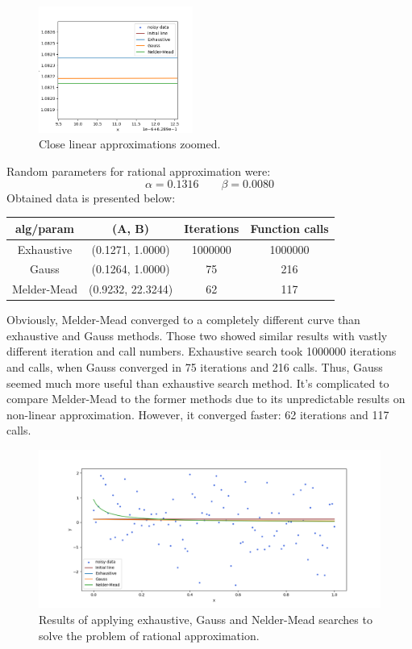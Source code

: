 \documentclass[12pt, a4paper]{article}
\begin{document}
\begin{figure}[!h]
\centering
\includegraphics[width=0.45\textwidth]{line2.png}
\caption{Close linear approximations zoomed.}
\end{figure}

Random parameters for rational approximation were:
\[ \alpha = 0.1316 \qquad \beta = 0.0080 \]
Obtained data is presented below:
\begin{center}
\begin{tabular}{cccc}
\hline
alg/param   & (A, B)            & Iterations & Function calls \\ \hline
Exhaustive  & (0.1271, 1.0000)  & 1000000    & 1000000        \\
Gauss       & (0.1264, 1.0000)  & 75         & 216            \\
Melder-Mead & (0.9232, 22.3244) & 62         & 117             \\ \hline
\end{tabular}
\end{center}
Obviously, Melder-Mead converged to a completely different curve than exhaustive and Gauss methods. Those two showed similar results with vastly different iteration and call numbers. Exhaustive search took 1000000 iterations and calls, when Gauss converged in 75 iterations and 216 calls. Thus, Gauss seemed much more useful than exhaustive search method. It's complicated to compare Melder-Mead to the former methods due to its unpredictable results on non-linear approximation. However, it converged faster: 62 iterations and 117 calls.

\begin{figure}[!h]
\centering
\includegraphics[width=\textwidth]{rational1.png}
\caption{Results of applying exhaustive, Gauss and Nelder-Mead searches to solve the problem of rational approximation.}
\end{figure}
\end{document}
